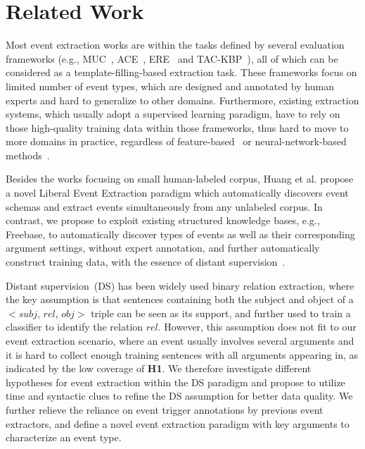\section{Related Work}
Most event extraction works are within the tasks defined by several evaluation frameworks (e.g., MUC~\cite{grishman1996message}, 
ACE~\cite{doddington2004automatic}, ERE~\cite{song2015light} and TAC-KBP~\cite{mitamura2015event}), 
all of which can be considered as a template-filling-based extraction task.
These frameworks focus on limited number of event types, which are designed and annotated by human experts and
hard to generalize to other domains.  
Furthermore, existing extraction systems, which usually adopt a supervised learning paradigm, 
have to rely on those high-quality training data within those frameworks, 
thus hard to move to more domains in practice, regardless of feature-based~\cite{gupta2009predicting,hong2011using,li2013joint} or neural-network-based methods~\cite{chen2015event,nguyen2016joint}.

Besides the works focusing on small human-labeled corpus, 
Huang et al.   propose a novel Liberal Event Extraction paradigm 
which automatically discovers event schemas and extract events simultaneously from any unlabeled corpus. 
In contrast, we propose to exploit existing structured knowledge bases, e.g., Freebase, to automatically discover 
types of events as well as their corresponding argument settings, without expert annotation, and further automatically
construct training data, with the essence of distant supervision~\cite{mintz2009distant}.

Distant supervision~(DS) has been widely used  binary relation extraction, where the key assumption is that 
 sentences containing both the subject and object of a $<$$subj$, $rel$, $obj$$>$ triple can be seen as its support, and further
used to train a classifier to identify the relation $rel$. However,  this assumption does not fit to our event extraction scenario, 
where an event usually involves several arguments and it is hard to collect enough training sentences with all arguments appearing in, as indicated by the low coverage of \textbf{H1}. We therefore investigate different hypotheses  for event extraction within the DS paradigm and propose to utilize time and syntactic clues to refine the DS assumption for better data quality. We further relieve the reliance on event trigger annotations by previous event extractors, and define a novel event extraction paradigm with key arguments to characterize an event type. 


